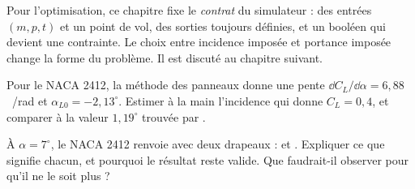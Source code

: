 \begin{projet}
Pour l'optimisation, ce chapitre fixe le \emph{contrat} du simulateur : des entrées $(m,p,t)$ et un point de vol, des sorties toujours définies, et un booléen  qui devient une contrainte. Le choix entre incidence imposée et portance imposée change la forme du problème. Il est discuté au chapitre suivant.
\end{projet}

\exercices
\begin{exercice}
Pour le NACA 2412, la méthode des panneaux donne une pente $\dd C_L/\dd\alpha=6{,}88$~/rad et $\alpha_{L0}=-2{,}13^\circ$. Estimer à la main l'incidence qui donne $C_L=0{,}4$, et comparer à la valeur $1{,}19^\circ$ trouvée par .
\end{exercice}
\begin{exercice}
À $\alpha=7^\circ$, le NACA 2412 renvoie  avec deux drapeaux :  et . Expliquer ce que signifie chacun, et pourquoi le résultat reste valide. Que faudrait-il observer pour qu'il ne le soit plus ?
\end{exercice}
